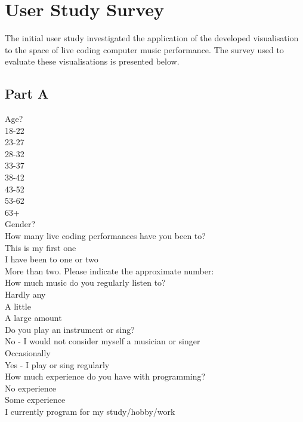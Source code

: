 \chapter{User Study Survey}

The initial user study investigated the application of the developed visualisation to the space of live coding computer music performance. The survey used to evaluate these visualisations is presented below.

\section*{Part A}

Age?\\
18-22\\
23-27\\
28-32\\
33-37\\
38-42\\
43-52\\
53-62\\
63+\\

Gender?   \underline{\hspace{3cm}}\\

How many live coding performances have you been to?\\
This is my first one\\
I have been to one or two\\
More than two. Please indicate the approximate number:   \underline{\hspace{3cm}}\\

How much music do you regularly listen to?\\
Hardly any\\
A little\\
A large amount\\

Do you play an instrument or sing?\\
No - I would not consider myself a musician or singer\\
Occasionally\\
Yes - I play or sing regularly\\

How much experience do you have with programming?\\
No experience\\
Some experience\\
I currently program for my study/hobby/work\\

